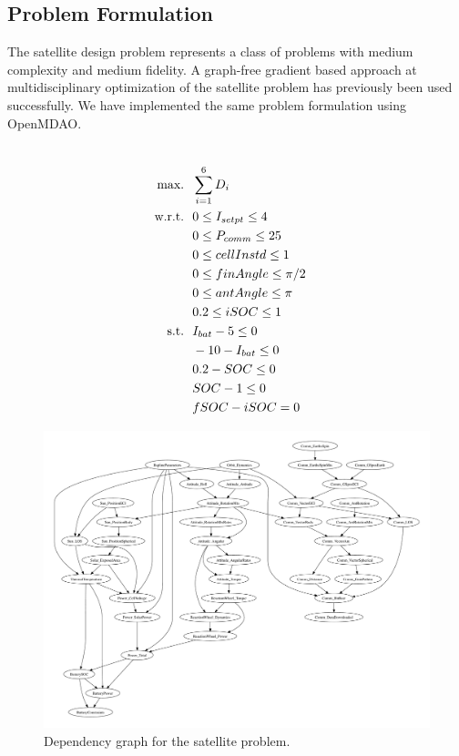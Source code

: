 \documentclass[]{aiaa-tc} %
\newcommand{\txt}{\textrm}
\begin{document}
    \subsection{Problem Formulation}

      The satellite design problem represents a class of problems with medium complexity and medium fidelity.
      A graph-free gradient based approach at multidisciplinary optimization of the satellite
      problem has previously been used successfully\cite{CADRE2012}. We have implemented
      the same problem formulation using OpenMDAO.

        \begin{align}
            \\\txt{max.} &\ \ \sum_{i=1}^6 D_i \notag
            \\\txt{w.r.t.} & \ \ 0 \le I_{setpt} \le 4 \notag
            \\     & \ \ 0 \le P_{comm} \le 25 \notag
            \\     & \ \ 0 \le cellInstd \le 1 \notag
            \\     & \ \ 0 \le finAngle \le \pi/2 \notag
            \\     & \ \ 0 \le antAngle \le \pi \notag
            \\     & \ \ 0.2 \le iSOC \le 1 \notag
            \\\txt{s.t.} & \ \ I_{bat} - 5 \le 0 \notag
            \\     & \ \ -10 - I_{bat} \le 0 \notag
            \\     & \ \ 0.2 - SOC \le 0 \notag
            \\     & \ \ SOC - 1 \le 0 \notag
            \\     & \ \ fSOC - iSOC = 0 \notag
            \label{eqn:sellar_formulation}
        \end{align}


        \begin{figure}[!htb]\begin{center}
          \includegraphics[width=1.1\textwidth]{images/CADRE.pdf}
          \caption{ Dependency graph for the satellite problem. \label{fig:cadre_graph}}
        \end{center}\end{figure}
\end{document}
